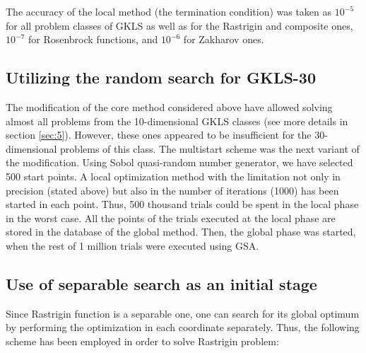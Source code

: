 \documentclass{llncs}
\begin{document}
The accuracy of the local method (the termination condition) was taken as $10^{-5}$ for all problem classes of GKLS as well as for the Rastrigin and composite ones,  $10^{-7}$ for Rosenbrock functions, and $10^{-6}$ for Zakharov ones.

\subsection{Utilizing the random search for GKLS-30}\label{random}

The modification of the core method considered above have allowed solving almost all problems from the 10-dimensional GKLS classes (see more details in section \ref{sec:5}). However, these ones appeared to be insufficient for the 30-dimensional problems of this class. 
The multistart scheme was the next variant of the modification. Using Sobol quasi-random number generator, we have selected 500 start points. A local optimization method with the limitation not only in precision (stated above) but also in the number of iterations (1000) has been started in each point. Thus, 500 thousand trials could be spent in the local phase in the worst case. All the points of the trials executed at the local phase are stored in the database of the global method. Then, the global phase was started, when the rest of 1 million trials were executed using GSA.

\subsection{Use of separable search as an initial stage}\label{separable}

Since Rastrigin function is a separable one, one can search for its global optimum by performing the optimization in each coordinate separately. Thus, the following scheme has been employed in order to solve Rastrigin problem:
\end{document}
